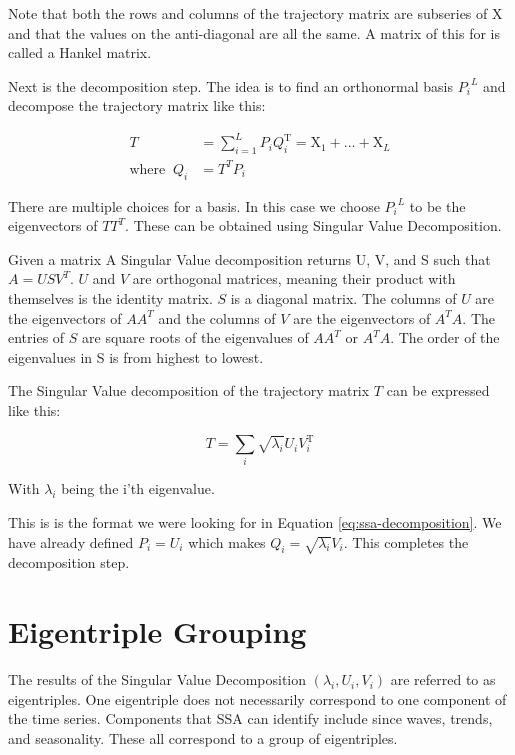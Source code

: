 Note that both the rows and columns of the trajectory matrix are subseries of X and that the values on the anti-diagonal are all the same. A matrix of this for is called a Hankel matrix. 

Next is the decomposition step. The idea is to find an orthonormal basis ${P_i}^L$ and decompose the trajectory matrix like this: 

\begin{equation}
   \begin{aligned}
   T&=\sum_{i=1}^{L} P_{i} Q_{i}^{\mathrm{T}}=\mathrm{X}_{1}+\ldots+\mathrm{X}_{L} \\
   \text{where} \;\; Q_i &= T^TP_i
   \end{aligned}
   \label{eq:ssa-decomposition}
\end{equation}

There are multiple choices for a basis. In this case we choose ${P_i}^L$ to be the eigenvectors of $TT^T$. These can be obtained using Singular Value Decomposition. 

Given a matrix A Singular Value decomposition returns U, V, and S such that $A = USV^T$. $U$ and $V$ are orthogonal matrices, meaning their product with themselves is the identity matrix. $S$ is a diagonal matrix. The columns of $U$ are the eigenvectors of $AA^T$ and the columns of $V$ are the eigenvectors of $A^TA$. The entries of $S$ are square roots of the eigenvalues of $AA^T$ or $A^TA$. The order of the eigenvalues in S is from highest to lowest. 

The Singular Value decomposition of the trajectory matrix $T$ can be expressed like this: 

\begin{equation}
T=\sum_{i} \sqrt{\lambda_{i}} U_{i} V_{i}^{\mathrm{T}}
\end{equation}

With $\lambda_i$ being the i'th eigenvalue.

This is is the format we were looking for in Equation \eqref{eq:ssa-decomposition}. We have already defined $P_i=U_i$ which makes $Q_i = \sqrt{\lambda_i}V_i$. This completes the decomposition step. \parencite{golyandina2014basic}

\section{Eigentriple Grouping}

The results of the Singular Value Decomposition $(\lambda_i, U_i, V_i)$ are referred to as eigentriples. One eigentriple does not necessarily correspond to one component of the time series. Components that SSA can identify include since waves, trends, and seasonality. These all correspond to a group of eigentriples. 

